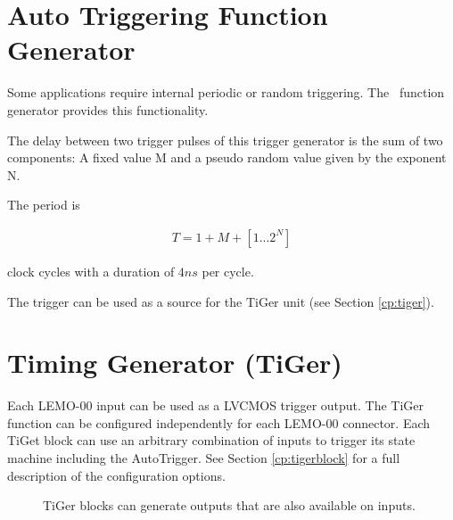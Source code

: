 
\pagebreak
\section{Auto Triggering Function Generator\label{cp:AutoTriggeringFunctionGenerator}}
Some applications require internal periodic or random triggering. The \deviceName\ function generator provides this functionality.\par

The delay between two trigger pulses of this trigger generator is the sum of two components: A fixed value M and a pseudo random value given by the exponent N. \par

The period is

\begin{align}
    T = 1 + M + [1...2^N]
\end{align}

clock cycles with a duration of $4 ns$ per cycle.\par

The trigger can be used as a source for the TiGer unit (see Section \ref{cp:tiger}).


\section{Timing Generator (TiGer)\label{cp:tiger}}
Each LEMO-00 input can be used as a LVCMOS trigger output. The TiGer function can be configured independently for each LEMO-00 connector. 
Each TiGet block can use an arbitrary combination of inputs to trigger its state machine including the AutoTrigger.
See Section \ref{cp:tigerblock} for a full description of the configuration options.

%
\begin{figure*}[ht]
    \begin{center}
        \caption{TiGer blocks can generate outputs that are also available on inputs.\label{fig:matrix}}
    \end{center}
\end{figure*}
%

